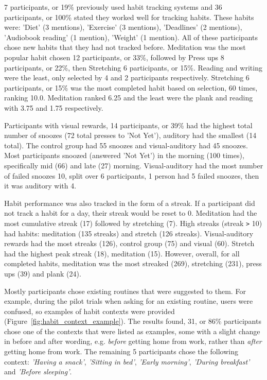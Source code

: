 7 participants, or 19\% previously used habit tracking systems and 36 participants, or 100\% stated they worked well for tracking habits. These habits were: 'Diet' (3 mentions), 'Exercise' (3 mentions), 'Deadlines' (2 mentions), 'Audiobook reading' (1 mention), 'Weight' (1 mention). All of these participants chose new habits that they had not tracked before. Meditation was the most popular habit chosen 12 participants, or 33\%, followed by Press ups 8 participants, or 22\%, then Stretching 6 participants, or 15\%. Reading and writing were the least, only selected by 4 and 2 participants respectively. Stretching 6 participants, or 15\% was the most completed habit based on selection, 60 times, ranking 10.0. Meditation ranked 6.25 and the least were the plank and reading with 3.75  and 1.75 respectively.

Participants with visual rewards, 14 participants, or 39\% had the highest total number of snoozes (72 total presses to 'Not Yet'), auditory had the smallest (14 total). The control group had 55 snoozes and visual-auditory had 45 snoozes. Most participants snoozed (answered 'Not Yet') in the morning (100 times), specifically mid (66) and late (27) morning. Visual-auditory had the most number of failed snoozes 10, split over 6 participants, 1 person had 5 failed snoozes, then it was auditory with 4.

Habit performance was also tracked in the form of a streak. If a participant did not track a habit for a day, their streak would be reset to 0. Meditation had the most cumulative streak (17) followed by stretching (7). High streaks (streak \verb|>| 10) had habits: meditation (135 streaks) and stretch (126 streaks). Visual-auditory rewards had the most streaks (126), control group (75) and visual (60). Stretch had the highest peak streak (18), meditation (15). However, overall, for all completed habits, meditation was the most streaked (269), stretching (231), press ups (39) and plank (24).

Mostly participants chose existing routines that were suggested to them. For example, during the pilot trials when asking for an existing routine, users were confused, so examples of habit contexts were provided (Figure~\ref{fig:habit_context_example}). The results found, 31, or 86\% participants chose one of the contexts that were listed as examples, some with a slight change in before and after wording, e.g. \textit{before} getting home from work, rather than \textit{after} getting home from work. The remaining 5 participants chose the following context: \textit{'Having a snack'}, \textit{'Sitting in bed'}, \textit{'Early morning'}, \textit{'During breakfast'} and \textit{'Before sleeping'}.

